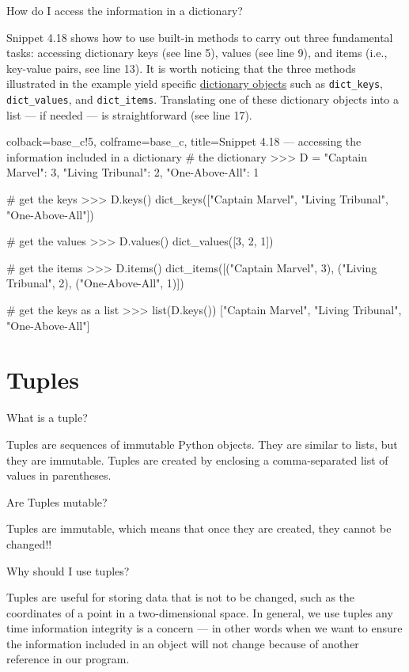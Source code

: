 \documentclass[a4paper,11pt]{book}
\newcommand{\question}[1]{%
    \begin{tcolorbox}[colback=comp_c!10,colframe=comp_c,sidebyside align=top,width=\linewidth,before skip=1ex]
        #1
    \end{tcolorbox}
    \switchcolumn%
}
\newcommand{\note}[1]{%
    \begin{tcolorbox}[colback=white!0,colframe=white!10,width=\linewidth,before skip=1ex]
        #1
    \end{tcolorbox}
}
\begin{document}
\begin{paracol}{2}
\question{\raggedright How do I access the information in a dictionary?}
\note{Snippet 4.18 shows how to use built-in methods to carry out three fundamental tasks: accessing dictionary keys (see line 5), values (see line 9), and items (i.e., key-value pairs, see line 13). It is worth noticing that the three methods illustrated in the example yield specific \href{https://docs.python.org/3/c-api/dict.html}{dictionary objects} such as \texttt{dict\_keys}, \texttt{dict\_values}, and \texttt{dict\_items}. Translating one of these dictionary objects into a list --- if needed --- is straightforward (see line 17).}
\end{paracol}
\clearpage

\begin{pythoncode}[linenos=true,]{colback=base_c!5, colframe=base_c, title=\sffamily Snippet 4.18 --- accessing the information included in a dictionary}
# the dictionary 
>>> D = {"Captain Marvel": 3, "Living Tribunal": 2, "One-Above-All": 1}

# get the keys
>>> D.keys()
dict_keys(["Captain Marvel", "Living Tribunal", "One-Above-All"])

# get the values 
>>> D.values()
dict_values([3, 2, 1])

# get the items
>>> D.items()
dict_items([("Captain Marvel", 3), ("Living Tribunal", 2), ("One-Above-All", 1)])

# get the keys as a list 
>>> list(D.keys())
["Captain Marvel", "Living Tribunal", "One-Above-All"]
\end{pythoncode}

\section{Tuples}

\begin{paracol}{2}
	\question{\raggedright What is a tuple?}
	\note{Tuples are sequences of immutable Python objects. They are similar to lists, but they are immutable. Tuples are created by enclosing a comma-separated list of values in parentheses.}
\end{paracol}

\begin{paracol}{2}
	\question{\raggedright Are Tuples mutable?}
	\note{Tuples are immutable, which means that once they are created, they cannot be changed!! }
\end{paracol}

\begin{paracol}{2}
\question{\raggedright Why should I use tuples?}
\note{Tuples are useful for storing data that is not to be changed, such as the coordinates of a point in a two-dimensional space. In general, we use tuples any time information integrity is a concern --- in other words when we want to ensure the information included in an object will not change because of another reference in our program.}
\end{paracol}
\end{document}
